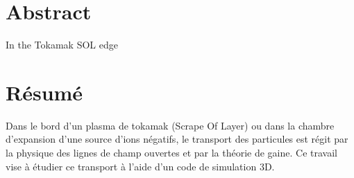 \thispagestyle{empty}
\cleardoublepage
\thispagestyle{preface}	
	\section*{Abstract}
		In the Tokamak SOL edge
	\section*{Résumé}
		Dans le bord d'un plasma de tokamak (Scrape Of Layer) 
		ou dans la chambre d'expansion d'une source d'ions négatifs,
		le transport des particules est régit par la physique des
		lignes de champ ouvertes et par la théorie de gaine.
		Ce travail vise à étudier ce transport à l'aide d'un code 
		de simulation 3D.